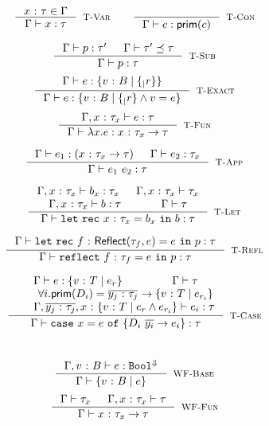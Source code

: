 \begin{figure}[!t]
\hfill{\fbox{\hastype{\env}{\prog}{\typ}}}\\
$$
\inference{
	\tbind{x}{\gtyp}\in\env
}{
	\hastype{\env}{x}{\gtyp}
}[\rtvar]
\qquad
\inference{
}{
	\hastype{\env}{c}{\constty{c}}
}[\rtconst]
$$

$$
\inference{
	\hastype{\env}{\prog}{\typ'} &
	\issubtype{\env}{\typ'}{\typ}
}{
	\hastype{\env}{\prog}{\typ}
}[\rtsub]
$$
$$
\inference{
	\hastype{\env}{e}{\tref{v}{\btyp}{\reft_r}}
}{
	\hastype{\env}{e}{\tref{v}{\btyp}{\reft_r\land v = e}}
}[\rtexact]
$$
$$
\inference{
	\hastype{\env, \tbind{x}{\typ_x}}{e}{\typ}
}{
	\hastype{\env}{\efun{x}{\typ}{e}}{\tfun{x}{\typ_x}{\typ}}
}[\rtfun]
$$

$$
\inference{
	\hastype{\env}{e_1}{(\tfun{x}{\typ_x}{\typ})} &&
	\hastype{\env}{e_2}{\typ_x}
}{
	\hastype{\env}{e_1\ e_2}{\typ}
}[\rtapp]
$$

$$
\inference
	{\hastype{\env, \tbind{x}{\gtyp_x}}{\bd_x}{\gtyp_x} &
	 \iswellformed{\env, \tbind{x}{\gtyp_x}}{\typ_x} \\
	 \hastype{\env, \tbind{x}{\gtyp_x}}{\bd}{\gtyp} &
	 \iswellformed{\env}{\typ}}
	{\hastype{\env}{\eletb{x}{\gtyp_x}{\bd_x}{\bd}}{\typ}}
	[\rtlet]
$$

$$
\inference
	{\hastype{\env}
	 				 {\eletb{f}{\exacttype{\gtyp_f}{e}}{e}{\prog}}
					 {\typ}
	}
	{\hastype{\env}
					 {\erefb{f}{\gtyp_f}{e}{\prog}}
					 {\typ}
	}[\rtreflect]
$$

$$
\inference{
	\hastype{\env}{e}{\tref{v}{T}{e_r}} & \iswellformed{\env}{\typ} \\
	& \forall i. \constty{\dc_i} = \tfunbasic{\overline{\tbind{y_j}{\typ_j}}}{\tref{v}{T}{e_{r_i}}} \\
	& \hastype{\env, \overline{\tbind{y_j}{\typ_j}}, \tbind{x}{\tref{v}{T}{e_r \land e_{r_i}}} }{e_i}{\typ}
}{
	\hastype{\env}{\ecase{x}{e}{\dc_i}{\overline{y_i}}{e_i}}{\typ}
}[\rtcase]
$$
\hfill{\fbox{\iswellformed{\env}{\typ}}}\\

$$
\inference{
  \hastype{\env,\tbind{v}{\btyp}}{\refa}{\tbool^{\tlabel}}
}{
	\iswellformed{\env}{\tref{v}{\btyp}{\refa}}
}[\rwbase]
$$
$$
\inference{
	\iswellformed{\env}{\typ_x} &
	\iswellformed{\env,\tbind{x}{\typ_x}}{\typ}
}{
	\iswellformed{\env}{\tfun{x}{\typ_x}{\typ}}
}[\rwfun]
$$

\hfill{}\\


\end{figure}

